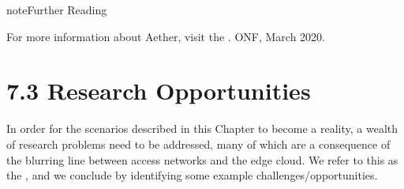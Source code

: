 \documentclass[a4paper,11pt,english]{sphinxmanual}
\begin{document}
\label{\detokenize{cloud:reading-aether}}
\begin{sphinxadmonition}{note}{Further Reading}

\sphinxAtStartPar
For more information about Aether, visit the . ONF, March 2020.
\end{sphinxadmonition}


\section{7.3 Research Opportunities}
\label{\detokenize{cloud:research-opportunities}}
\sphinxAtStartPar
In order for the scenarios described in this Chapter to become a
reality, a wealth of research problems need to be addressed, many of
which are a consequence of the blurring line between access networks
and the edge cloud. We refer to this as the , and we
conclude by identifying some example challenges/opportunities.
\end{document}
